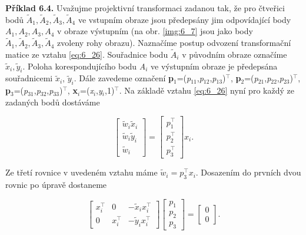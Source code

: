 \noindent \textbf{Příklad 6.4.} Uvažujme projektivní transformaci zadanou tak, že pro čtveřici bodů $\tilde{A}_{1} ,\tilde{A}_{2} ,\tilde{A}_{3} ,\tilde{A}_{4} $ ve vstupním obraze jsou předepsány jim odpovídající body $A_{1} ,A_{2} ,A_{3} ,A_{4} $ v obraze výstupním (na obr. \ref{img:6_7} jsou jako body $\tilde{A}_{1}, \tilde{A}_{2}, \tilde{A}_{3}, \tilde{A}_{4}$ zvoleny rohy obrazu). Naznačíme postup odvození transformační matice ze vztahu \eqref{eq:6_26}. Souřadnice bodu $\tilde{A}_{i}$ v původním obraze označíme $\tilde{x}_{i} ,\tilde{y}_{i} $. Poloha korespondujícího bodu \textit{A}$_i$ ve výstupním obraze je předepsána souřadnicemi $\tilde{x}_i$, $\tilde{y}_i$. Dále zavedeme označení \textbf{p}$_1$=(\textit{p}$_{11}$,\textit{p}$_{12}$,\textit{p}$_{13}$)$^\top$, \textbf{p}$_2$=(\textit{p}$_{21}$,\textit{p}$_{22}$,\textit{p}$_{23}$)$^\top$, \textbf{p}$_3$=(\textit{p}$_{31}$,\textit{p}$_{32}$,\textit{p}$_{33}$)$^\top$, \textbf{x}$_i$=(\textit{x}$_i$,\textit{y}$_i$,1)$^\top$. Na základě vztahu \eqref{eq:6_26} nyní pro každý ze zadaných bodů dostáváme 

\begin{equation}
    \left[\begin{array}{c} {\tilde{w}_{i} \tilde{x}_{i} } \\ {\tilde{w}_{i} \tilde{y}_{i} } \\ {\tilde{w}_{i} } \end{array}\right]=\left[\begin{array}{c} {p_{1}^\top} \\ {p_{2}^\top} \\ {p_{3}^\top} \end{array}\right]x_{i}. \nonumber
\end{equation}

Ze třetí rovnice v uvedeném vztahu máme $\tilde{w}_{i} =p_{3}^\top x_{i} $. Dosazením do prvních dvou rovnic po úpravě dostaneme

\begin{equation}
    \left[\begin{array}{ccc} {x_{i}^\top} & {0} & {-\tilde{x}_{i} x_{i}^\top} \\ {0} & {x_{i}^\top} & {-\tilde{y}_{i} x_{i}^\top} \end{array}\right]\left[\begin{array}{c} {p_{1} } \\ {p_{2} } \\ {p_{3} } \end{array}\right]=\left[\begin{array}{c} {0} \\ {0} \end{array}\right]. \nonumber
\end{equation}

